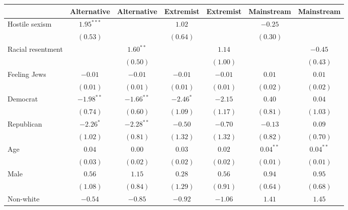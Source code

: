 
\usepackage{booktabs}

\begin{table}
\begin{center}
\begin{tabular}{l c c c c c c}
\toprule
 & Alternative & Alternative & Extremist & Extremist & Mainstream & Mainstream \\
\midrule
Hostile sexism    & $1.95^{***}$ &              & $1.02$       &              & $-0.25$       &               \\
                  & $(0.53)$     &              & $(0.64)$     &              & $(0.30)$      &               \\
Racial resentment &              & $1.60^{**}$  &              & $1.14$       &               & $-0.45$       \\
                  &              & $(0.50)$     &              & $(1.00)$     &               & $(0.43)$      \\
Feeling Jews      & $-0.01$      & $-0.01$      & $-0.01$      & $-0.01$      & $0.01$        & $0.01$        \\
                  & $(0.01)$     & $(0.01)$     & $(0.01)$     & $(0.01)$     & $(0.02)$      & $(0.02)$      \\
Democrat          & $-1.98^{**}$ & $-1.66^{**}$ & $-2.46^{*}$  & $-2.15$      & $0.40$        & $0.04$        \\
                  & $(0.74)$     & $(0.60)$     & $(1.09)$     & $(1.17)$     & $(0.81)$      & $(1.03)$      \\
Republican        & $-2.26^{*}$  & $-2.28^{**}$ & $-0.50$      & $-0.70$      & $-0.13$       & $0.09$        \\
                  & $(1.02)$     & $(0.81)$     & $(1.32)$     & $(1.32)$     & $(0.82)$      & $(0.70)$      \\
Age               & $0.04$       & $0.00$       & $0.03$       & $0.02$       & $0.04^{**}$   & $0.04^{**}$   \\
                  & $(0.03)$     & $(0.02)$     & $(0.02)$     & $(0.02)$     & $(0.01)$      & $(0.01)$      \\
Male              & $0.56$       & $1.15$       & $0.28$       & $0.56$       & $0.94$        & $0.95$        \\
                  & $(1.08)$     & $(0.84)$     & $(1.29)$     & $(0.91)$     & $(0.64)$      & $(0.68)$      \\
Non-white         & $-0.54$      & $-0.85$      & $-0.92$      & $-1.06$      & $1.41$        & $1.45$        \\

\end{tabular}
\end{center}
\end{table}
